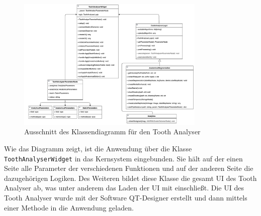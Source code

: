 \begin{figure}[h]
	\centering
	\includegraphics[width=0.8\textwidth]{img/toothAnalyserClasses.png}
	\caption{Ausschnitt des Klassendiagramm für den Tooth Analyser}
	\label{fig:klassendiagramm}
\end{figure}

Wie das Diagramm zeigt, ist die Anwendung über die Klasse \texttt{ToothAnalyserWidget}
in das Kernsystem eingebunden. Sie hält auf der einen Seite alle Parameter der
verschiedenen Funktionen und auf der anderen Seite die dazugehörigen Logiken. Des
Weiteren bildet diese Klasse die gesamt UI des Tooth Analyser ab, was unter
anderem das Laden der \ac{UI} mit einschließt. Die UI des Tooth Analyser wurde
mit der Software QT-Designer erstellt und dann mittels einer Methode in die
Anwendung geladen.

